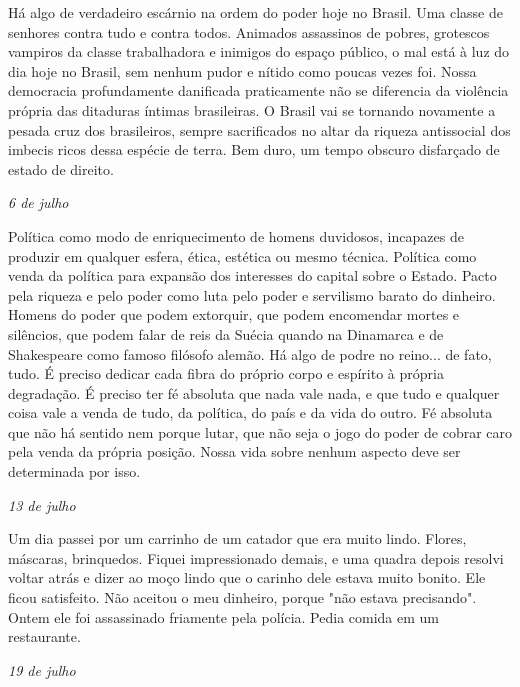 Há algo de verdadeiro escárnio na ordem do poder hoje no Brasil. Uma
classe de senhores contra tudo e contra todos. Animados assassinos de
pobres, grotescos vampiros da classe trabalhadora e inimigos do espaço
público, o mal está à luz do dia hoje no Brasil, sem nenhum pudor e
nítido como poucas vezes foi. Nossa democracia profundamente danificada
praticamente não se diferencia da violência própria das ditaduras
íntimas brasileiras. O Brasil vai se tornando novamente a pesada cruz
dos brasileiros, sempre sacrificados no altar da riqueza antissocial dos
imbecis ricos dessa espécie de terra. Bem duro, um tempo obscuro
disfarçado de estado de direito.

\pagebreak

\begin{flushright}
\emph{6 de julho}
\end{flushright}

Política como modo de enriquecimento de homens duvidosos, incapazes de
produzir em qualquer esfera, ética, estética ou mesmo técnica. Política
como venda da política para expansão dos interesses do capital sobre o
Estado. Pacto pela riqueza e pelo poder como luta pelo poder e
servilismo barato do dinheiro. Homens do poder que podem extorquir, que
podem encomendar mortes e silêncios, que podem falar de reis da Suécia
quando na Dinamarca e de Shakespeare como famoso filósofo alemão. Há
algo de podre no reino... de fato, tudo. É preciso dedicar cada fibra do
próprio corpo e espírito à própria degradação. É preciso ter fé absoluta
que nada vale nada, e que tudo e qualquer coisa vale a venda de tudo, da
política, do país e da vida do outro. Fé absoluta que não há sentido nem
porque lutar, que não seja o jogo do poder de cobrar caro pela venda da
própria posição. Nossa vida sobre nenhum aspecto deve ser determinada
por isso.

\begin{flushright}
\emph{13 de julho}
\end{flushright}

Um dia passei por um carrinho de um catador que era muito lindo. Flores,
máscaras, brinquedos. Fiquei impressionado demais, e uma quadra depois
resolvi voltar atrás e dizer ao moço lindo que o carinho dele estava
muito bonito. Ele ficou satisfeito. Não aceitou o meu dinheiro, porque
"não estava precisando". Ontem ele foi assassinado friamente pela
polícia. Pedia comida em um restaurante.

\pagebreak

\begin{flushright}
\emph{19 de julho}
\end{flushright}

